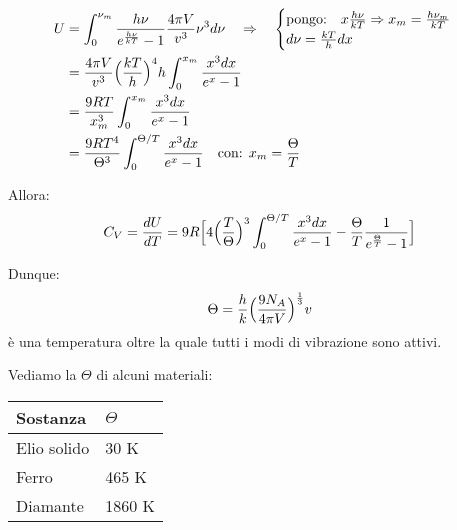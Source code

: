 \begin{equation}
\begin{split}
U & = \int_0^{\nu_m}  \frac{ h \nu}{e^{ \frac{ h \nu}{k T } } - 1 } \frac{ 4 \pi V}{v^3 } \nu^3  d\nu \quad \Rightarrow \quad
\begin{cases}
	\mbox{pongo:} \quad x \frac{ h \nu}{k T } \Rightarrow x_m = \frac{ h \nu_m}{k T } \\
	d\nu = \frac{ kT}{h } dx
\end{cases} \\
& = \frac{ 4 \pi V}{v^3 } \Bigl(  \frac{ kT}{h }  \Bigr)^4 h \int_0^{x_m} \frac{ x^3 dx}{e^x -1 } \\
& = \frac{ 9 R T}{x_m^3 } \int_0^{x_m} \frac{ x^3 dx}{e^x - 1 } \\
& = \frac{ 9 R T^4}{\Theta^3 } \int_0^{\Theta / T} \frac{ x^3 dx}{e^x -1 } \quad \mbox{con: } x_m = \frac{ \Theta}{T }
\end{split}
\end{equation}

Allora:
\begin{equation}
C_V = \frac{ dU}{dT } = 9R \Bigl[ 4 \Bigl(  \frac{ T}{\Theta }  \Bigr)^3 \int_0^{\Theta / T} \frac{ x^3 dx}{e^x -1 } - \frac{ \Theta}{T }\frac{ 1}{e^{ \frac{ \Theta}{T } } - 1 } \Bigr]
\end{equation}

Dunque:
\begin{equation}
\Theta = \frac{ h}{k } \Bigl(  \frac{ 9N_A}{4 \pi V }  \Bigr)^{ \frac{ 1}{3 } } v
\end{equation}
è una temperatura oltre la quale tutti i modi di vibrazione sono attivi.

Vediamo la $\Theta$ di alcuni materiali:
\begin{table}[h]
\centering
\begin{tabular}{|l|l|}
\hline
\textbf{Sostanza}    & \textbf{$\Theta$} \\ \hline
Elio solido & 30 K     \\ \hline
Ferro       & 465 K    \\ \hline
Diamante    & 1860 K   \\ \hline
\end{tabular}
\end{table}



